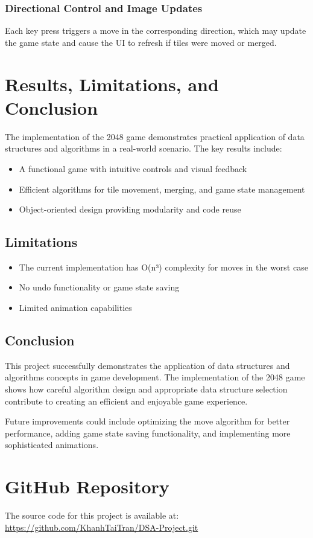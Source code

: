 \documentclass[12pt, a4paper]{article}
\begin{document}
\subsubsection{Directional Control and Image Updates}
Each key press triggers a move in the corresponding direction, which may update the game state and cause the UI to refresh if tiles were moved or merged.

\section{Results, Limitations, and Conclusion}

The implementation of the 2048 game demonstrates practical application of data structures and algorithms in a real-world scenario. The key results include:

\begin{itemize}
    \item A functional game with intuitive controls and visual feedback
    \item Efficient algorithms for tile movement, merging, and game state management
    \item Object-oriented design providing modularity and code reuse
\end{itemize}

\subsection{Limitations}
\begin{itemize}
    \item The current implementation has O(n³) complexity for moves in the worst case
    \item No undo functionality or game state saving
    \item Limited animation capabilities
\end{itemize}

\subsection{Conclusion}
This project successfully demonstrates the application of data structures and algorithms concepts in game development. The implementation of the 2048 game shows how careful algorithm design and appropriate data structure selection contribute to creating an efficient and enjoyable game experience.

Future improvements could include optimizing the move algorithm for better performance, adding game state saving functionality, and implementing more sophisticated animations.

\section{GitHub Repository}
The source code for this project is available at: \url{https://github.com/KhanhTaiTran/DSA-Project.git}
\end{document}
